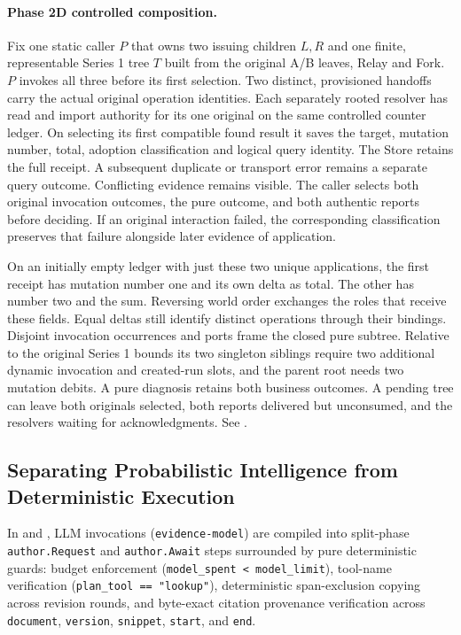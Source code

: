 \documentclass[11pt,a4paper]{article}
\theoremstyle{definition}
\theoremstyle{remark}
\begin{document}
\paragraph{Phase 2D controlled composition.} Fix one static caller $P$ that owns two issuing children $L,R$ and one finite, representable Series 1 tree $T$ built from the original A/B leaves, Relay and Fork. $P$ invokes all three before its first selection. Two distinct, provisioned handoffs carry the actual original operation identities. Each separately rooted resolver has read and import authority for its one original on the same controlled counter ledger. On selecting its first compatible found result it saves the target, mutation number, total, adoption classification and logical query identity. The Store retains the full receipt. A subsequent duplicate or transport error remains a separate query outcome. Conflicting evidence remains visible. The caller selects both original invocation outcomes, the pure outcome, and both authentic reports before deciding. If an original interaction failed, the corresponding classification preserves that failure alongside later evidence of application.

On an initially empty ledger with just these two unique applications, the first receipt has mutation number one and its own delta as total. The other has number two and the sum. Reversing world order exchanges the roles that receive these fields. Equal deltas still identify distinct operations through their bindings. Disjoint invocation occurrences and ports frame the closed pure subtree. Relative to the original Series 1 bounds its two singleton siblings require two additional dynamic invocation and created-run slots, and the parent root needs two mutation debits. A pure diagnosis retains both business outcomes. A pending tree can leave both originals selected, both reports delivered but unconsumed, and the resolvers waiting for acknowledgments. See .

\subsection{Separating Probabilistic Intelligence from Deterministic Execution}
In  and , LLM invocations (\texttt{evidence-model}) are compiled into split-phase \texttt{author.Request} and \texttt{author.Await} steps surrounded by pure deterministic guards: budget enforcement (\texttt{model\_spent < model\_limit}), tool-name verification (\texttt{plan\_tool == "lookup"}), deterministic span-exclusion copying across revision rounds, and byte-exact citation provenance verification across \texttt{document}, \texttt{version}, \texttt{snippet}, \texttt{start}, and \texttt{end}.
\end{document}
